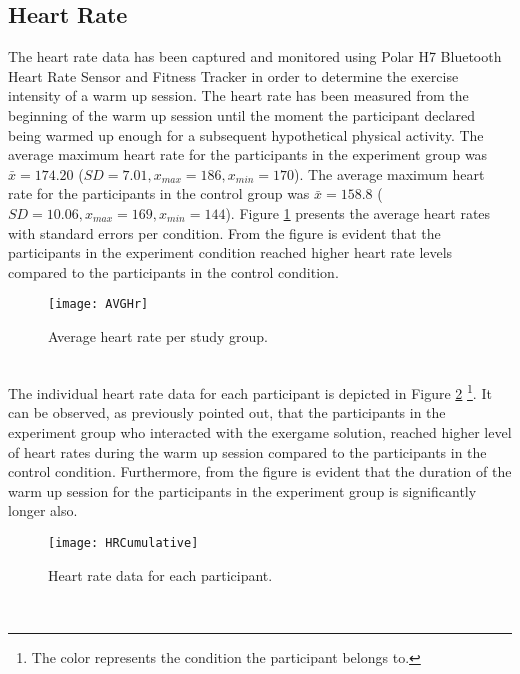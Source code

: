 \subsection{Heart Rate}
The heart rate data has been captured and monitored using Polar H7 Bluetooth Heart Rate Sensor and Fitness Tracker in order to determine the exercise intensity of a warm up session. The heart rate has been measured from the beginning of the warm up session until the moment the participant declared being warmed up enough for a subsequent hypothetical physical activity. The average maximum heart rate for the participants in the experiment group was \begin{math}\bar{x} = 174.20 \end{math} (\begin{math} SD= 7.01, x_{max}=186, x_{min}=170 \end{math}). The average maximum heart rate for the participants in the control group was \begin{math}\bar{x} = 158.8 \end{math} (\begin{math} SD= 10.06, x_{max}= 169, x_{min}= 144\end{math}). Figure \ref{fig:hrdata} presents the average heart rates with standard errors per condition. From the figure is evident that the participants in the experiment condition reached higher heart rate levels compared to the participants in the control condition.\\ %
\begin{figure}[h]
    \centering
    \texttt{[image: AVGHr]}
    \caption{Average heart rate per study group.}
    \label{fig:hrdata}
\end{figure}\\
The individual heart rate data for each participant is depicted in Figure \ref{fig:hrCumulative}  \footnote{The color represents the condition the participant belongs to.}. It can be observed, as previously pointed out, that the participants in the experiment group who interacted with the exergame solution, reached higher level of heart rates during the warm up session compared to the participants in the control condition. Furthermore, from the figure is evident that the duration of the warm up session for the participants in the experiment group is significantly longer also.\pagebreak
\begin{figure}[h]
    \centering
    \texttt{[image: HRCumulative]}
    \caption{Heart rate data for each participant.}
    \label{fig:hrCumulative}
\end{figure}\\
